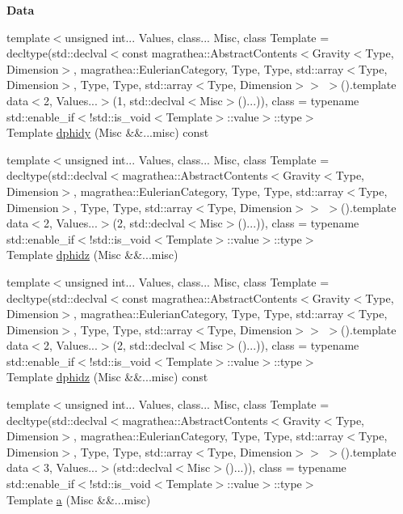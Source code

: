 \begin{Indent}{\bf Data}
\begin{DoxyCompactItemize}
\item 
{\footnotesize template$<$unsigned int... Values, class... Misc, class Template  = decltype(std\-::declval$<$const magrathea\-::\-Abstract\-Contents$<$\-Gravity$<$\-Type, Dimension$>$, magrathea\-::\-Eulerian\-Category, Type, Type, std\-::array$<$\-Type, Dimension$>$, Type, Type, std\-::array$<$\-Type, Dimension$>$$>$ $>$().\-template data$<$2, Values...$>$(1, std\-::declval$<$\-Misc$>$()...)), class  = typename std\-::enable\-\_\-if$<$!std\-::is\-\_\-void$<$\-Template$>$\-::value$>$\-::type$>$ }\\Template \hyperlink{exceptionGravity_adfd468d2bc0e2552baa7ff8a5b193593}{dphidy} (Misc \&\&...misc) const 
\item 
{\footnotesize template$<$unsigned int... Values, class... Misc, class Template  = decltype(std\-::declval$<$magrathea\-::\-Abstract\-Contents$<$\-Gravity$<$\-Type, Dimension$>$, magrathea\-::\-Eulerian\-Category, Type, Type, std\-::array$<$\-Type, Dimension$>$, Type, Type, std\-::array$<$\-Type, Dimension$>$$>$ $>$().\-template data$<$2, Values...$>$(2, std\-::declval$<$\-Misc$>$()...)), class  = typename std\-::enable\-\_\-if$<$!std\-::is\-\_\-void$<$\-Template$>$\-::value$>$\-::type$>$ }\\Template \hyperlink{exceptionGravity_a32e15efbb775e2628f5725ebe5aeee1a}{dphidz} (Misc \&\&...misc)
\item 
{\footnotesize template$<$unsigned int... Values, class... Misc, class Template  = decltype(std\-::declval$<$const magrathea\-::\-Abstract\-Contents$<$\-Gravity$<$\-Type, Dimension$>$, magrathea\-::\-Eulerian\-Category, Type, Type, std\-::array$<$\-Type, Dimension$>$, Type, Type, std\-::array$<$\-Type, Dimension$>$$>$ $>$().\-template data$<$2, Values...$>$(2, std\-::declval$<$\-Misc$>$()...)), class  = typename std\-::enable\-\_\-if$<$!std\-::is\-\_\-void$<$\-Template$>$\-::value$>$\-::type$>$ }\\Template \hyperlink{exceptionGravity_a0f35a078d6741e273b982dad0bcb6934}{dphidz} (Misc \&\&...misc) const 
\item 
{\footnotesize template$<$unsigned int... Values, class... Misc, class Template  = decltype(std\-::declval$<$magrathea\-::\-Abstract\-Contents$<$\-Gravity$<$\-Type, Dimension$>$, magrathea\-::\-Eulerian\-Category, Type, Type, std\-::array$<$\-Type, Dimension$>$, Type, Type, std\-::array$<$\-Type, Dimension$>$$>$ $>$().\-template data$<$3, Values...$>$(std\-::declval$<$\-Misc$>$()...)), class  = typename std\-::enable\-\_\-if$<$!std\-::is\-\_\-void$<$\-Template$>$\-::value$>$\-::type$>$ }\\Template \hyperlink{exceptionGravity_ad037d5e27a7a8406a038a1e9938db264}{a} (Misc \&\&...misc)

\end{DoxyCompactItemize}
\end{Indent}
